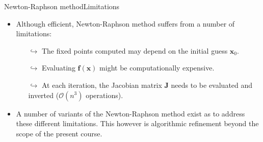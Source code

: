 \documentclass[usenames,dvipsnames,svgnames,10pt,aspectratio=169]{beamer}
\begin{document}
\begin{frame}[t, c]{Newton-Raphson method}{Limitations}
	\begin{itemize}
		\item Although efficient, Newton-Raphson method suffers from a number of limitations:
		\begin{itemize}
			\item[$\hookrightarrow$] The fixed points computed may depend on the initial guess ${\bm x}_0$.
			\item[$\hookrightarrow$] Evaluating ${\bm f}({\bm x})$ might be computationally expensive.
			\item[$\hookrightarrow$] At each iteration, the Jacobian matrix ${\bm J}$ needs to be evaluated and inverted ($\mathcal{O}(n^3)$ operations).
		\end{itemize}

		\bigskip

		\item A number of variants of the Newton-Raphson method exist as to address these different limitations. This however is algorithmic refinement beyond the scope of the present course.
	\end{itemize}

	\vspace{1cm}
\end{frame}
\end{document}
